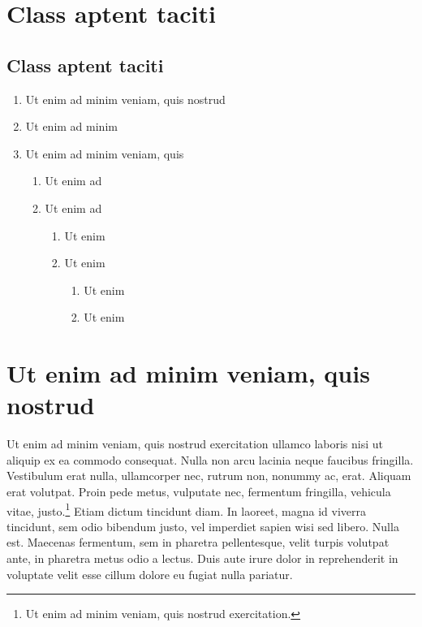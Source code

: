 \section{Class aptent taciti}

\lipsum[2]

\subsection{Class aptent taciti}

\lipsum[6-7]

\begin{enumerate}
  \item Ut enim ad minim veniam, quis nostrud
  \item Ut enim ad minim
  \item Ut enim ad minim veniam, quis
        \begin{enumerate}
          \item Ut enim ad
          \item Ut enim ad
                \begin{enumerate}
                  \item Ut enim
                  \item Ut enim
                        \begin{enumerate}
                          \item Ut enim
                          \item Ut enim
                        \end{enumerate}
                \end{enumerate}
        \end{enumerate}
\end{enumerate}


\section{Ut enim ad minim veniam, quis nostrud}

Ut enim ad minim veniam, quis nostrud exercitation ullamco laboris nisi ut aliquip ex ea commodo consequat. Nulla non arcu lacinia neque faucibus fringilla. Vestibulum erat nulla, ullamcorper nec, rutrum non, nonummy ac, erat. Aliquam erat volutpat. Proin pede metus, vulputate nec, fermentum fringilla, vehicula vitae, justo.\footnote{Ut enim ad minim veniam, quis nostrud exercitation.} Etiam dictum tincidunt diam. In laoreet, magna id viverra tincidunt, sem odio bibendum justo, vel imperdiet sapien wisi sed libero. Nulla est. Maecenas fermentum, sem in pharetra pellentesque, velit turpis volutpat ante, in pharetra metus odio a lectus. Duis aute irure dolor in reprehenderit in voluptate velit esse cillum dolore eu fugiat nulla pariatur.

